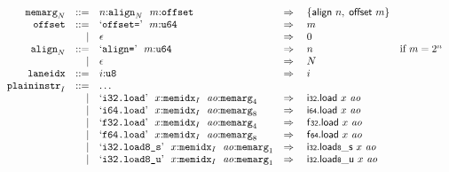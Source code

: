 \vspace{1ex}

$$
\begin{array}[t]{@{}lrrl@{}l@{}l@{}l@{}}
& {{\mathtt{memarg}}}_{N} & ::= & n{:}{{\mathtt{align}}}_{N}~~m{:}{\mathtt{offset}} & \quad\Rightarrow\quad{} & \{ \mathsf{align}~n,\;\allowbreak \mathsf{offset}~m \} \\
& {\mathtt{offset}} & ::= & \mbox{‘\texttt{offset{=}}’}~~m{:}{\mathtt{u64}} & \quad\Rightarrow\quad{} & m \\
& & | & \epsilon & \quad\Rightarrow\quad{} & 0 \\
& {{\mathtt{align}}}_{N} & ::= & \mbox{‘\texttt{align{=}}’}~~m{:}{\mathtt{u64}} & \quad\Rightarrow\quad{} & n & \quad \mbox{if}~ m = {2^{n}} \\
& & | & \epsilon & \quad\Rightarrow\quad{} & N \\
& {\mathtt{laneidx}} & ::= & i{:}{\mathtt{u8}} & \quad\Rightarrow\quad{} & i \\
& {{\mathtt{plaininstr}}}_{I} & ::= & \dots \\
& & | & \mbox{‘\texttt{i32.load}’}~~x{:}{{\mathtt{memidx}}}_{I}~~{\mathit{ao}}{:}{{\mathtt{memarg}}}_{4} & \quad\Rightarrow\quad{} & \mathsf{i{\scriptstyle 32}}{.}\mathsf{load}~x~{\mathit{ao}} \\
& & | & \mbox{‘\texttt{i64.load}’}~~x{:}{{\mathtt{memidx}}}_{I}~~{\mathit{ao}}{:}{{\mathtt{memarg}}}_{8} & \quad\Rightarrow\quad{} & \mathsf{i{\scriptstyle 64}}{.}\mathsf{load}~x~{\mathit{ao}} \\
& & | & \mbox{‘\texttt{f32.load}’}~~x{:}{{\mathtt{memidx}}}_{I}~~{\mathit{ao}}{:}{{\mathtt{memarg}}}_{4} & \quad\Rightarrow\quad{} & \mathsf{f{\scriptstyle 32}}{.}\mathsf{load}~x~{\mathit{ao}} \\
& & | & \mbox{‘\texttt{f64.load}’}~~x{:}{{\mathtt{memidx}}}_{I}~~{\mathit{ao}}{:}{{\mathtt{memarg}}}_{8} & \quad\Rightarrow\quad{} & \mathsf{f{\scriptstyle 64}}{.}\mathsf{load}~x~{\mathit{ao}} \\
& & | & \mbox{‘\texttt{i32.load8\_s}’}~~x{:}{{\mathtt{memidx}}}_{I}~~{\mathit{ao}}{:}{{\mathtt{memarg}}}_{1} & \quad\Rightarrow\quad{} & {\mathsf{i{\scriptstyle 32}}{.}\mathsf{load}}{{\mathsf{{\scriptstyle 8}}}{\mathsf{\_}}{\mathsf{s}}}~x~{\mathit{ao}} \\
& & | & \mbox{‘\texttt{i32.load8\_u}’}~~x{:}{{\mathtt{memidx}}}_{I}~~{\mathit{ao}}{:}{{\mathtt{memarg}}}_{1} & \quad\Rightarrow\quad{} & {\mathsf{i{\scriptstyle 32}}{.}\mathsf{load}}{{\mathsf{{\scriptstyle 8}}}{\mathsf{\_}}{\mathsf{u}}}~x~{\mathit{ao}} \\

\end{array}$$
